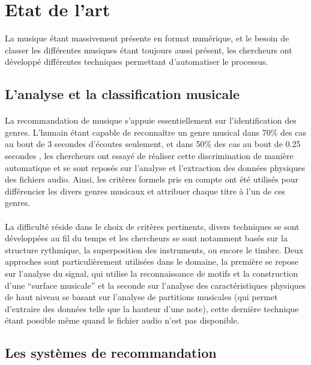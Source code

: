 \documentclass{ir}
\begin{document}
\section{Etat de l'art}
La musique étant massivement présente en format numérique, et le besoin de classer les différentes musiques 
étant toujours aussi présent, les chercheurs ont développé différentes techniques permettant d’automatiser 
le processus.

\subsection{L’analyse et la classification musicale}
\paragraph{}
La recommandation de musique s’appuie essentiellement sur l’identification des genres. L’humain étant capable 
de reconnaître un genre musical dans 70\% des cas au bout de 3 secondes d’écoutes seulement, et dans 50\% 
des cas au bout de 0.25 secondes \cite{TechniqueSimilarites}, les chercheurs ont essayé de réaliser cette 
discrimination de manière automatique et se sont reposés sur l’analyse et l’extraction des données physiques 
des fichiers audio. Ainsi, les critères formels pris en compte ont été utilisés pour différencier les divers 
genres musicaux et attribuer chaque titre à l’un de ces genres.
\paragraph{}
La difficulté réside dans le choix de critères pertinents, divers techniques se sont développées au fil du 
temps et les chercheurs se sont notamment basés sur la structure rythmique, la superposition des instruments, 
ou encore le timbre. Deux approches sont particulièrement utilisées dans le domaine, la première se repose 
sur l’analyse du signal, qui utilise la reconnaissance de motifs et la construction d’une “surface musicale” 
\cite{TechniqueSimilarites} et la seconde sur l'analyse des caractéristiques physiques de haut niveau se 
basant sur l’analyse de partitions musicales (qui permet d’extraire des données telle que la hauteur d’une 
note), cette dernière technique étant possible même quand le fichier audio n’est pas disponible.

\subsection{Les systèmes de recommandation}
\end{document}
